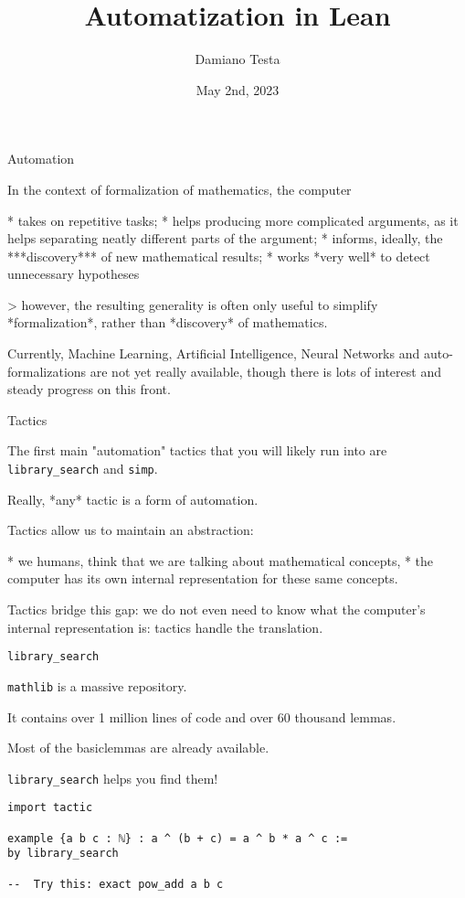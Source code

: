 \documentclass{beamer}
\title{Automatization in Lean}
\author{Damiano Testa}
\institute{University of Warwick}
\date{May 2nd, 2023}
\begin{document}
\frame{\titlepage}

\begin{frame}[fragile]
{Automation}

In the context of formalization of mathematics, the computer

* takes on repetitive tasks;
* helps producing more complicated arguments, as it helps separating neatly different parts of the argument;
* informs, ideally, the ***discovery*** of new mathematical results;
* works *very well* to detect unnecessary hypotheses

  > however, the resulting generality is often only useful to simplify *formalization*, rather than *discovery* of mathematics.


Currently, Machine Learning, Artificial Intelligence, Neural Networks and auto-formalizations are not yet really available, though there is lots of interest and steady progress on this front.

\end{frame}
\begin{frame}[fragile]

{Tactics}

The first main "automation" tactics that you will likely run into are {\verb`library_search`} and {\verb`simp`}.

Really, *any* tactic is a form of automation.

Tactics allow us to maintain an abstraction:

*  we humans, think that we are talking about mathematical concepts,
*  the computer has its own internal representation for these same concepts.

Tactics bridge this gap: we do not even need to know what the computer's internal representation is: tactics handle the translation.

\end{frame}
\begin{frame}[fragile]

{{\texttt{library\_search}}}

{\verb`mathlib`} is a massive repository.

It contains over 1 million lines of code and over 60 thousand lemmas.

Most of the basic\footnotemark lemmas are already available.

{\verb`library_search`} helps you find them!

\begin{verbatim}
import tactic

example {a b c : ℕ} : a ^ (b + c) = a ^ b * a ^ c :=
by library_search

--  Try this: exact pow_add a b c
\end{verbatim}


\end{frame}
\end{document}
